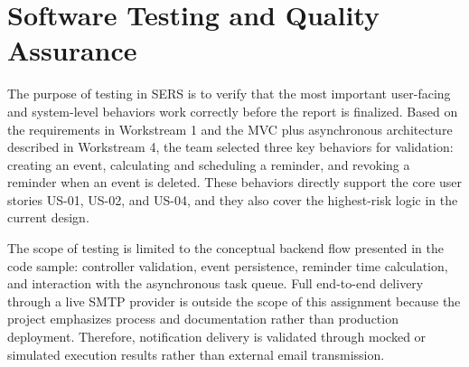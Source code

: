 \section{Software Testing and Quality Assurance}
The purpose of testing in SERS is to verify that the most important user-facing and system-level behaviors work correctly before the report is finalized. Based on the requirements in Workstream 1 and the MVC plus asynchronous architecture described in Workstream 4, the team selected three key behaviors for validation: creating an event, calculating and scheduling a reminder, and revoking a reminder when an event is deleted. These behaviors directly support the core user stories US-01, US-02, and US-04, and they also cover the highest-risk logic in the current design.

The scope of testing is limited to the conceptual backend flow presented in the code sample: controller validation, event persistence, reminder time calculation, and interaction with the asynchronous task queue. Full end-to-end delivery through a live SMTP provider is outside the scope of this assignment because the project emphasizes process and documentation rather than production deployment. Therefore, notification delivery is validated through mocked or simulated execution results rather than external email transmission.

